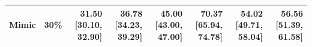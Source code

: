 \begin{tabular}{llrrrrrr}
Mimic & 30\% & \shortstack{31.50\\{}[30.10, 32.90]} & \shortstack{36.78\\{}[34.23, 39.29]} & \shortstack{45.00\\{}[43.00, 47.00]} & \shortstack{70.37\\{}[65.94, 74.78]} & \shortstack{54.02\\{}[49.71, 58.04]} & \shortstack{56.56\\{}[51.39, 61.58]} \\
\bottomrule
\end{tabular}
